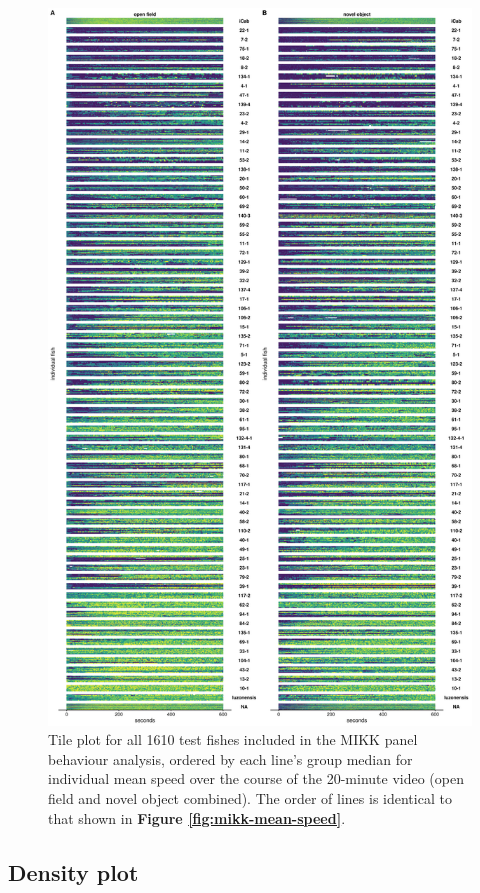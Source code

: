 \documentclass[
]{book}
\begin{document}
\begin{figure}
\includegraphics[width=1\linewidth]{figs/mikk_behaviour/0.08_15_tile_dge} \caption{Tile plot for all 1610 test fishes included in the MIKK panel behaviour analysis, ordered by each line's group median for individual mean speed over the course of the 20-minute video (open field and novel object combined). The order of lines is identical to that shown in \textbf{Figure \ref{fig:mikk-mean-speed}}.}\label{fig:mikk-all-tile-dge}
\end{figure}

\hypertarget{density-plot}{%
\subsection{Density plot}\label{density-plot}}
\end{document}
